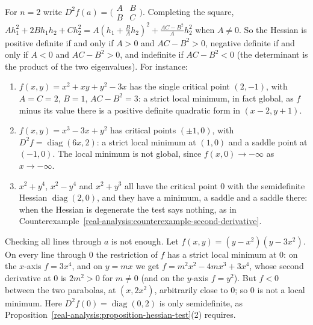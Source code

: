\begin{example}\label{real-analysis:example-hessian-two-variables}
For $n = 2$ write $D^2f(a) = \bigl(\begin{smallmatrix} A & B\\ B & C\end{smallmatrix}\bigr)$. Completing the square, $Ah_1^2 + 2Bh_1h_2 + Ch_2^2 = A(h_1 + \frac BAh_2)^2 + \frac{AC - B^2}{A}h_2^2$ when
$A \neq 0$. So the Hessian is positive definite if and only if $A > 0$ and $AC - B^2 > 0$, negative definite if and only if $A < 0$ and $AC - B^2 > 0$, and indefinite if $AC - B^2 < 0$ (the
determinant is the product of the two eigenvalues). For instance:
\begin{enumerate}
\item $f(x, y) = x^2 + xy + y^2 - 3x$ has the single critical point $(2, -1)$, with $A = C = 2$, $B = 1$, $AC - B^2 = 3$: a strict local minimum, in fact global, as $f$ minus its value there is a positive
definite quadratic form in $(x - 2, y + 1)$.
\item $f(x, y) = x^3 - 3x + y^2$ has critical points $(\pm1, 0)$, with $D^2f = \operatorname{diag}(6x, 2)$: a strict local minimum at $(1, 0)$ and a saddle point at $(-1, 0)$. The local minimum is not
global, since $f(x, 0) \to -\infty$ as $x \to -\infty$.
\item $x^2 + y^4$, $x^2 - y^4$ and $x^2 + y^3$ all have the critical point $0$ with the semidefinite Hessian $\operatorname{diag}(2, 0)$, and they have a minimum, a saddle and a saddle there:
when the Hessian is degenerate the test says nothing, as in Counterexample~\ref{real-analysis:counterexample-second-derivative}.
\end{enumerate}
\end{example}

\begin{counterexample}\label{real-analysis:counterexample-lines}
Checking all lines through $a$ is not enough. Let $f(x, y) = (y - x^2)(y - 3x^2)$. On every line through $0$ the restriction of $f$ has a strict local minimum at $0$: on the $x$-axis $f = 3x^4$, and on
$y = mx$ we get $f = m^2x^2 - 4mx^3 + 3x^4$, whose second derivative at $0$ is $2m^2 > 0$ for $m \neq 0$ (and on the $y$-axis $f = y^2$). But $f < 0$ between the two parabolas, at $(x, 2x^2)$, arbitrarily
close to $0$; so $0$ is not a local minimum. Here $D^2f(0) = \operatorname{diag}(0, 2)$ is only semidefinite, as Proposition~\ref{real-analysis:proposition-hessian-test}(2) requires.
\end{counterexample}

